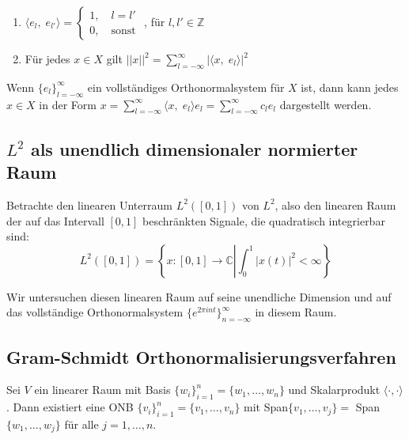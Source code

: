 \documentclass[11pt]{article}
\begin{document}
\vspace*{-0.5cm}
\begin{enumerate}
    \item $\langle e_l, \; e_{l'} \rangle = \begin{cases}
        1, \hspace{12pt} l = l' \\
        0, \hspace{12pt} \text{sonst}
        \end{cases}$ \hspace{12pt}, für $l,l' \in \mathbb{Z}$
    \item Für jedes $x\in X$ gilt $||x||^2 = \displaystyle\sum_{l=-\infty}^\infty |\langle x, \; e_l \rangle|^2$
\end{enumerate}

\vspace*{-0.5cm}
Wenn $\{e_l\}_{l = -\infty}^\infty$ ein vollständiges Orthonormalsystem für $X$ ist, dann kann jedes $x\in X$ in der Form $x = \sum_{l=-\infty}^\infty \langle x, \; e_l \rangle e_l = \sum_{l=-\infty}^\infty c_l e_l$ dargestellt werden.

\subsection*{$L^2$ als unendlich dimensionaler normierter Raum}
\vspace*{-0.5cm}
Betrachte den linearen Unterraum $L^2([0,1])$ von $L^2$, also den linearen Raum der auf das Intervall $[0,1]$ beschränkten Signale, die quadratisch integrierbar sind:
$$L^2\left( [0,1] \right) = \left\{ x: [0,1] \to \mathbb{C} \left| \int_0^1 |x(t)|^2 < \infty \right. \right\}$$

\vspace*{-0.5cm}
Wir untersuchen diesen linearen Raum auf seine unendliche Dimension und auf das vollständige Orthonormalsystem $\{e^{2 \pi i n t}\}_{n = -\infty}^\infty$ in diesem Raum.


\vfill \null
\pagebreak

\subsection*{Gram-Schmidt Orthonormalisierungsverfahren}
\vspace*{-0.5cm}
Sei $V$ ein linearer Raum mit Basis $\{ w_i \}_{i=1}^n = \{ w_1, \dots, w_n \}$ und Skalarprodukt $\langle \cdot, \cdot \rangle$. Dann existiert eine ONB $\{v_i\}_{i=1}^n = \{v_1, \dots, v_n\}$ mit Span$\{v_1, \dots, v_j\} = $ Span$\{w_1, \dots, w_j\}$ für alle $j = 1, \dots, n$.
\end{document}
